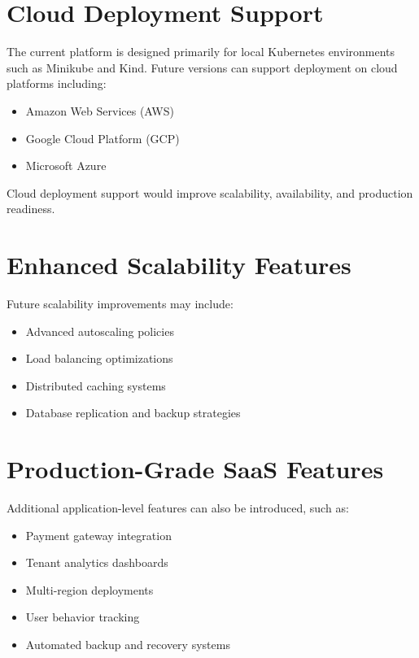 \documentclass[12pt,a4paper]{report}
\begin{document}
\section{Cloud Deployment Support}

The current platform is designed primarily for local Kubernetes environments such as Minikube and Kind. Future versions can support deployment on cloud platforms including:

\begin{itemize}

    \item Amazon Web Services (AWS)
    \item Google Cloud Platform (GCP)
    \item Microsoft Azure

\end{itemize}

Cloud deployment support would improve scalability, availability, and production readiness.

\section{Enhanced Scalability Features}

Future scalability improvements may include:

\begin{itemize}

    \item Advanced autoscaling policies
    \item Load balancing optimizations
    \item Distributed caching systems
    \item Database replication and backup strategies

\end{itemize}

\section{Production-Grade SaaS Features}

Additional application-level features can also be introduced, such as:

\begin{itemize}

    \item Payment gateway integration
    \item Tenant analytics dashboards
    \item Multi-region deployments
    \item User behavior tracking
    \item Automated backup and recovery systems

\end{itemize}
\end{document}
